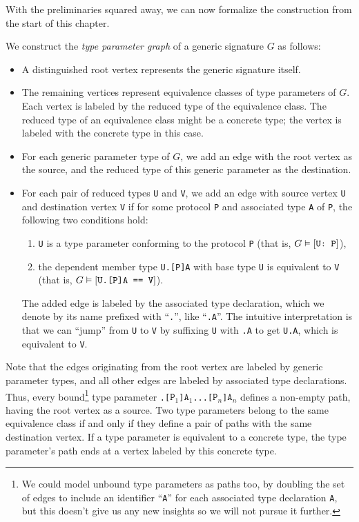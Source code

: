 \documentclass[../generics]{subfiles}
\begin{document}
\smallskip
With the preliminaries squared away, we can now formalize the construction from the start of this chapter. 
\begin{definition}
We construct the \emph{type parameter graph} of a generic signature $G$ as follows:
\begin{itemize}
\item A distinguished root vertex represents the generic signature itself.
\item The remaining vertices represent equivalence classes of type parameters of $G$. Each vertex is labeled by the reduced type of the equivalence class. The reduced type of an equivalence class might be a concrete type; the vertex is labeled with the concrete type in this case.
\item For each generic parameter type of $G$, we add an edge with the root vertex as the source, and the reduced type of this generic parameter as the destination.
\item For each pair of reduced types \texttt{U} and \texttt{V}, we add an edge with source vertex \texttt{U} and destination vertex \texttt{V} if for some protocol \texttt{P} and associated type \texttt{A} of \texttt{P}, the following two conditions hold:
\begin{enumerate}
\item \texttt{U} is a type parameter conforming to the protocol \texttt{P} (that is, $G\vDash[\texttt{U:~P}]$),
\item the dependent member type \texttt{U.[P]A} with base type \texttt{U} is equivalent to \texttt{V} (that is, $G\vDash[\texttt{U.[P]A == V}]$).
\end{enumerate}
The added edge is labeled by the associated type declaration, which we denote by its name prefixed with ``\texttt{.}'', like ``\texttt{.A}''. The intuitive interpretation is that we can ``jump'' from \texttt{U} to \texttt{V} by suffixing \texttt{U} with \texttt{.A} to get \texttt{U.A}, which is equivalent to \texttt{V}.
\end{itemize}
\end{definition}

Note that the edges originating from the root vertex are labeled by generic parameter types, and all other edges are labeled by associated type declarations. Thus, every bound\footnote{We could model unbound type parameters as paths too, by doubling the set of edges to include an identifier ``\texttt{A}'' for each associated type declaration \texttt{A}, but this doesn't give us any new insights so we will not pursue it further.} type parameter \texttt{.[$\texttt{P}_1$]$\texttt{A}_1$...[$\texttt{P}_n$]$\texttt{A}_n$} defines a non-empty path, having the root vertex as a source. Two type parameters belong to the same equivalence class if and only if they define a pair of paths with the same destination vertex. If a type parameter is equivalent to a concrete type, the type parameter's path ends at a vertex labeled by this concrete type.
\end{document}
